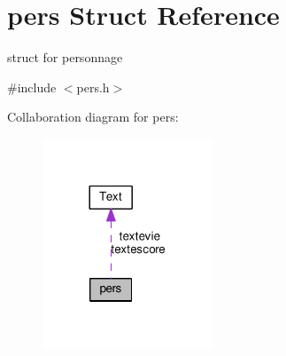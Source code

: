 \hypertarget{structpers}{}\section{pers Struct Reference}
\label{structpers}


struct for personnage  




{\ttfamily \#include $<$pers.\+h$>$}



Collaboration diagram for pers\+:
\nopagebreak
\begin{figure}[H]
\begin{center}
\leavevmode
\includegraphics[width=144pt]{structpers__coll__graph}
\end{center}
\end{figure}
